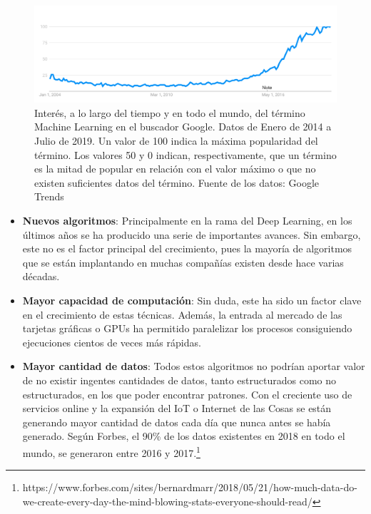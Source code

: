 \documentclass[
  12pt,
  spanish,
  a4paperpaper,
]{report}
\providecommand{\tightlist}{%
  \setlength{\itemsep}{0pt}\setlength{\parskip}{0pt}}
\begin{document}
\begin{figure}
\centering
\includegraphics[width=1\textwidth,height=\textheight]{source/figures/interes-ml.png}
\caption{Interés, a lo largo del tiempo y en todo el mundo, del término
Machine Learning en el buscador Google. Datos de Enero de 2014 a Julio
de 2019. Un valor de 100 indica la máxima popularidad del término. Los
valores 50 y 0 indican, respectivamente, que un término es la mitad de
popular en relación con el valor máximo o que no existen suficientes
datos del término. Fuente de los datos: Google Trends
\label{interes-ml}}
\end{figure}

\begin{itemize}
\tightlist
\item
  \textbf{Nuevos algoritmos}: Principalmente en la rama del Deep
  Learning, en los últimos años se ha producido una serie de importantes
  avances. Sin embargo, este no es el factor principal del crecimiento,
  pues la mayoría de algoritmos que se están implantando en muchas
  compañías existen desde hace varias décadas.
\item
  \textbf{Mayor capacidad de computación}: Sin duda, este ha sido un
  factor clave en el crecimiento de estas técnicas. Además, la entrada
  al mercado de las tarjetas gráficas o GPUs ha permitido paralelizar
  los procesos consiguiendo ejecuciones cientos de veces más rápidas.
\item
  \textbf{Mayor cantidad de datos}: Todos estos algoritmos no podrían
  aportar valor de no existir ingentes cantidades de datos, tanto
  estructurados como no estructurados, en los que poder encontrar
  patrones. Con el creciente uso de servicios online y la expansión del
  IoT o Internet de las Cosas se están generando mayor cantidad de datos
  cada día que nunca antes se había generado. Según Forbes, el 90\% de
  los datos existentes en 2018 en todo el mundo, se generaron entre 2016
  y 2017.\footnote{https://www.forbes.com/sites/bernardmarr/2018/05/21/how-much-data-do-we-create-every-day-the-mind-blowing-stats-everyone-should-read/}
\end{itemize}
\end{document}
